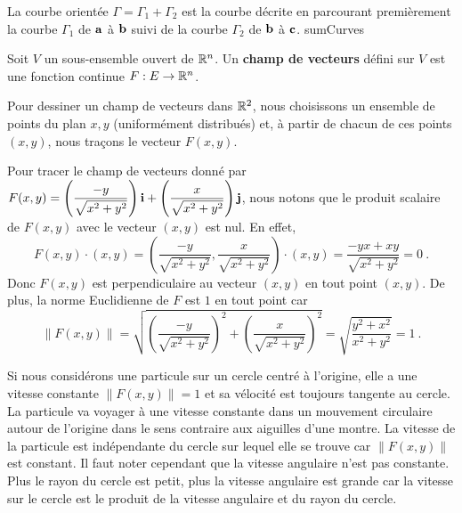 {
{La courbe orientée $\Gamma = \Gamma_1 + \Gamma_2$ est la courbe
décrite en parcourant premièrement la courbe $\Gamma_1$ de $\mathbf{a}$ à
$\mathbf{b}$ suivi de la courbe $\Gamma_2$ de $\mathbf{b}$ à $\mathbf{c}$.}
{sumCurves}

\begin{defn} 
Soit $V$ un sous-ensemble ouvert de $\mathbb{R}^n$.  Un {\bfseries champ de vecteurs}
défini sur $V$ est une fonction continue $F:E \rightarrow \mathbb{R}^n$.
\end{defn}

Pour dessiner un champ de vecteurs dans $\mathbb{R}^2$, nous choisissons un
ensemble de points du plan $x,y$ (uniformément distribués) et, à partir
de chacun de ces points $(x,y)$, nous traçons le vecteur $F(x,y)$.

\begin{egg}
Pour tracer le champ de vecteurs donné par $\displaystyle
F(x,y) = \left( \frac{-y}{\sqrt{x^2+y^2}}\right) \mathbf{i} +
\left( \frac{x}{\sqrt{x^2+y^2}}\right)\mathbf{j}$, nous notons que le produit
scalaire de $F(x,y)$ avec le vecteur $(x,y)$ est nul.  En effet,
\[
  F(x,y) \cdot (x,y)
  = \left( \frac{-y}{\sqrt{x^2+y^2}}, \frac{x}{\sqrt{x^2+y^2}}\right)
  \cdot (x,y) = \frac{-yx + xy}{\sqrt{x^2+y^2}} = 0 \ .
\]
Donc $F(x,y)$ est perpendiculaire au vecteur $(x,y)$ en tout
point $(x,y)$.  De plus, la norme Euclidienne de $F$ est $1$ en
tout point car
\[
  \|F(x,y)\| =
  \sqrt{ \left( \frac{-y}{\sqrt{x^2+y^2}}\right)^2
    + \left(\frac{x}{\sqrt{x^2+y^2}}\right)^2}
  = \sqrt{\frac{y^2 + x^2}{x^2 + y^2}} = 1 \ .
\]


Si nous considérons une particule sur un cercle centré à l'origine, elle a
une vitesse constante $\|F(x,y)\| = 1$ et sa vélocité est
toujours tangente au cercle.  La particule va voyager à une vitesse
constante dans un mouvement circulaire autour de l'origine dans le
sens contraire aux aiguilles d'une montre.  La vitesse de la particule
est indépendante du cercle sur lequel elle se trouve car
$\|F(x,y)\|$ est constant.  Il faut noter cependant que la
vitesse angulaire n'est pas constante.  Plus le rayon du cercle est
petit, plus la vitesse angulaire est grande car la vitesse sur le
cercle est le produit de la vitesse angulaire et du rayon du cercle.
\end{egg}

}
